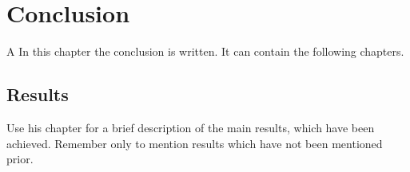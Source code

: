 \chapter{Conclusion}
A In this chapter the conclusion is written. It can contain the following chapters.

\section{Results}
Use his chapter for a brief description of the main results, which have been achieved. Remember only to mention results which have not been mentioned prior. 

